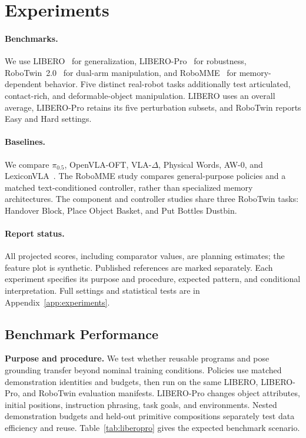 \section{Experiments}
\label{sec:experiments}
\paragraph{Benchmarks.}
We use LIBERO~\cite{libero} for generalization, LIBERO-Pro~\cite{liberopro} for robustness, RoboTwin~2.0~\cite{robotwin} for dual-arm manipulation, and RoboMME~\cite{robomme} for memory-dependent behavior. Five distinct real-robot tasks additionally test articulated, contact-rich, and deformable-object manipulation. LIBERO uses an overall average, LIBERO-Pro retains its five perturbation subsets, and RoboTwin reports Easy and Hard settings.

\paragraph{Baselines.}
We compare $\pi_{0.5}$, OpenVLA-OFT, VLA-$\Delta$, Physical Words, AW-0, and LexiconVLA~\cite{pi05,oft,vladelta,physicalwords,aw0,lexiconvla}. The RoboMME study compares general-purpose policies and a matched text-conditioned controller, rather than specialized memory architectures. The component and controller studies share three RoboTwin tasks: Handover Block, Place Object Basket, and Put Bottles Dustbin.

\paragraph{Report status.}
All projected scores, including comparator values, are planning estimates; the feature plot is synthetic. Published references are marked separately. Each experiment specifies its purpose and procedure, expected pattern, and conditional interpretation. Full settings and statistical tests are in Appendix~\ref{app:experiments}.

\subsection{Benchmark Performance}
\label{sec:benchmarks}
\textbf{Purpose and procedure.} We test whether reusable programs and pose grounding transfer beyond nominal training conditions. Policies use matched demonstration identities and budgets, then run on the same LIBERO, LIBERO-Pro, and RoboTwin evaluation manifests. LIBERO-Pro changes object attributes, initial positions, instruction phrasing, task goals, and environments. Nested demonstration budgets and held-out primitive compositions separately test data efficiency and reuse. Table~\ref{tab:liberopro} gives the expected benchmark scenario.

